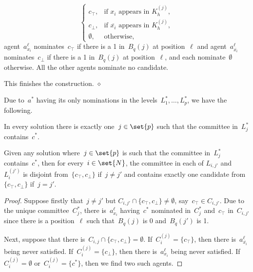 \documentclass[10pt,a4paper,twocolumn]{article}
\theoremstyle{plain}
\theoremstyle{definition}
\theoremstyle{remark}
\newcommand{\cqed}{\hfill$\diamond$}
\newcommand{\false}{\bot}
\newcommand{\true}{\top}
\newcommand{\ol}[1]{\overline{#1}}
\newcommand{\lneg}[1]{\ensuremath{\ol{#1}}}
\begin{document}
{{\begin{construction}
\begin{compactenum}[(i)]
\[\begin{cases}
                                    c_\true, & \text{if~$x_i$ appears in~$K_h^{(j)}$},\\
                                    c_\false, & \text{if~$\lneg{x_i}$ appears in~$K_h^{(j)}$},\\
                                    \emptyset,& \text{otherwise},
                                    \end{cases}
    \] 
    agent~$a_{x_i}^\ell$ nominates~$c_\true$ if there is a 1 in~$B_{q}(j)$ at position~$\ell$
    and agent~$a_{\lneg{x_i}}^\ell$ nominates~$c_\false$ if there is a 1 in~$B_{q}(j)$ at position~$\ell$,
    and each nominate~$\emptyset$ otherwise.
    All the other agents nominate no candidate.
    \end{compactenum}
    This finishes the construction.
    \cqed
  \end{construction}

  Due to~$a^*$ having its only nominations in the levels~$L_1^*,\dots,L_p^*$,
  we have the following.

  \begin{observation}
  \label{obs:FMLAnoPKnpy}
  In every solution
  there is exactly one~$j\in\set{p}$ such that
  the committee in~$L_j^*$ contains~$c^*$.
  \end{observation}

  \begin{lemma}
  \label{lem:FMLAnoPKnpy}
  Given any solution
  where~$j\in\set{p}$ is such that
  the committee in~$L_j^*$ contains~$c^*$,
  then for every~$i\in\set{N}$,
  the committee in each of $L_{i,j'}$ and~$L_{i}^{(j')}$ is disjoint from~$\{c_\true,c_\false\}$ if~$j\neq j'$ 
  and contains exactly one candidate from~$\{c_\true,c_\false\}$ if~$j=j'$.
  \end{lemma}

  \begin{proof}
  Suppose firstly that~$j\neq j'$ but $C_{i,j'}\cap \{c_\true,c_\false\}\neq \emptyset$,
  say~$c_\true\in C_{i,j'}$.
  Due to the unique committee~$C_j^*$,
  there is~$a_{x_i}^\ell$ having~$c^*$ nominated in~$C_j^*$
  and~$c_\true$ in~$C_{i,j'}$
  since there is a position~$\ell$ such that~$B_q(j)$ is 0 and~$B_q(j')$ is 1.
  
  Next,
  suppose that there is~$C_{i,j}\cap \{c_\true,c_\false\}= \emptyset$.
  If~$C_i^{(j)}=\{c_\true\}$,
  then there is~$a_{\lneg{x_i}}^\ell$ being never satisfied.
  If~$C_i^{(j)}=\{c_\false\}$,
  then there is~$a_{x_i}^\ell$ being never satisfied.
  If~$C_i^{(j)}=\emptyset$ or~$C_i^{(j)}=\{c^*\}$,
  then we find two such agents.
  \end{proof}

}}
\end{document}
